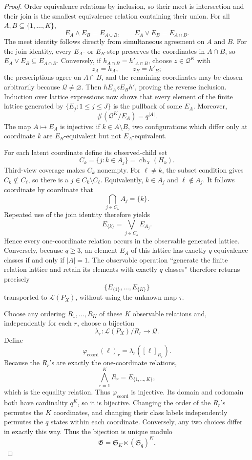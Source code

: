 \documentclass{article}
\begin{document}
\begin{proof}
Order equivalence relations by inclusion, so their meet is intersection and their join is the smallest equivalence relation containing their union.  For all \(A,B\subseteq\{1,\ldots,K\}\),
\[
 E_A\wedge E_B=E_{A\cup B},
 \qquad
 E_A\vee E_B=E_{A\cap B}.
\]
The meet identity follows directly from simultaneous agreement on \(A\) and \(B\).  For the join identity, every \(E_A\)- or \(E_B\)-step preserves the coordinates in \(A\cap B\), so \(E_A\vee E_B\subseteq E_{A\cap B}\).  Conversely, if \(h_{A\cap B}=h'_{A\cap B}\), choose \(z\in\mathcal Q^K\) with
\[
 z_A=h_A,
 \qquad z_B=h'_B;
\]
the prescriptions agree on \(A\cap B\), and the remaining coordinates may be chosen arbitrarily because \(\mathcal Q\ne\varnothing\).  Then \(h\mathrel{E_A}z\mathrel{E_B}h'\), proving the reverse inclusion.  Induction over lattice expressions now shows that every element of the finite lattice generated by \(\{E_j:1\le j\le J\}\) is the pullback of some \(E_A\).  Moreover,
\[
 \#(\mathcal Q^K/E_A)=q^{|A|}.
\]
The map \(A\mapsto E_A\) is injective: if \(k\in A\setminus B\), two configurations which differ only at coordinate \(k\) are \(E_B\)-equivalent but not \(E_A\)-equivalent.

For each latent coordinate define its observed-child set
\[
 C_k=\{j:k\in A_j\}=\operatorname{ch}_X(H_k).
\]
Third-view coverage makes \(C_k\) nonempty.  For \(\ell\ne k\), the subset condition gives \(C_k\nsubseteq C_\ell\), so there is a \(j\in C_k\setminus C_\ell\).  Equivalently, \(k\in A_j\) and \(\ell\notin A_j\).  It follows coordinate by coordinate that
\[
 \bigcap_{j\in C_k}A_j=\{k\}.
\]
Repeated use of the join identity therefore yields
\[
 E_{\{k\}}=\bigvee_{j\in C_k}E_{A_j}.
\]
Hence every one-coordinate relation occurs in the observable generated lattice.  Conversely, because \(q\ge3\), an element \(E_A\) of this lattice has exactly \(q\) equivalence classes if and only if \(|A|=1\).  The observable operation ``generate the finite relation lattice and retain its elements with exactly \(q\) classes'' therefore returns precisely
\[
 \{E_{\{1\}},\ldots,E_{\{K\}}\}
\]
transported to \(\mathscr L(P_X)\), without using the unknown map \(\tau\).

Choose any ordering \(R_1,\ldots,R_K\) of these \(K\) observable relations and, independently for each \(r\), choose a bijection
\[
 \lambda_r:\mathscr L(P_X)/R_r\longrightarrow\mathcal Q.
\]
Define
\[
 \varphi_{\mathrm{coord}}(\ell)_r
 =\lambda_r\!\left([\ell]_{R_r}\right).
\]
Because the \(R_r\)'s are exactly the one-coordinate relations,
\[
 \bigwedge_{r=1}^KR_r=E_{\{1,\ldots,K\}},
\]
which is the equality relation.  Thus \(\varphi_{\mathrm{coord}}\) is injective.  Its domain and codomain both have cardinality \(q^K\), so it is bijective.  Changing the order of the \(R_r\)'s permutes the \(K\) coordinates, and changing their class labels independently permutes the \(q\) states within each coordinate.  Conversely, any two choices differ in exactly this way.  Thus the bijection is unique modulo
\[
 \mathfrak G=\mathfrak S_K\ltimes(\mathfrak S_q)^K.
\]


\end{proof}
\end{document}
